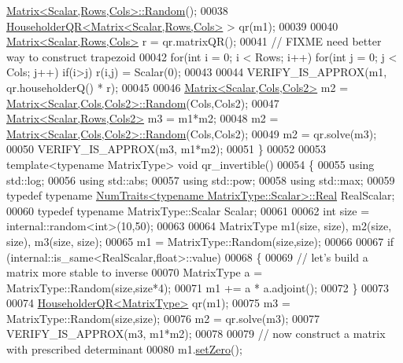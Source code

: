 \begin{DoxyCode}
      \hyperlink{group___core___module_class_eigen_1_1_matrix}{Matrix<Scalar,Rows,Cols>::Random}();
00038   \hyperlink{group___q_r___module_class_eigen_1_1_householder_q_r}{HouseholderQR<Matrix<Scalar,Rows,Cols>} > qr(m1);
00039 
00040   \hyperlink{group___core___module_class_eigen_1_1_matrix}{Matrix<Scalar,Rows,Cols>} r = qr.matrixQR();
00041   \textcolor{comment}{// FIXME need better way to construct trapezoid}
00042   \textcolor{keywordflow}{for}(\textcolor{keywordtype}{int} i = 0; i < Rows; i++) for(int j = 0; j < Cols; j++) if(i>j) r(i,j) = Scalar(0);
00043 
00044   VERIFY\_IS\_APPROX(m1, qr.householderQ() * r);
00045 
00046   \hyperlink{group___core___module_class_eigen_1_1_matrix}{Matrix<Scalar,Cols,Cols2>} m2 = 
      \hyperlink{group___core___module_class_eigen_1_1_matrix}{Matrix<Scalar,Cols,Cols2>::Random}(Cols,Cols2);
00047   \hyperlink{group___core___module_class_eigen_1_1_matrix}{Matrix<Scalar,Rows,Cols2>} m3 = m1*m2;
00048   m2 = \hyperlink{group___core___module_class_eigen_1_1_matrix}{Matrix<Scalar,Cols,Cols2>::Random}(Cols,Cols2);
00049   m2 = qr.solve(m3);
00050   VERIFY\_IS\_APPROX(m3, m1*m2);
00051 \}
00052 
00053 \textcolor{keyword}{template}<\textcolor{keyword}{typename} MatrixType> \textcolor{keywordtype}{void} qr\_invertible()
00054 \{
00055   \textcolor{keyword}{using} std::log;
00056   \textcolor{keyword}{using} std::abs;
00057   \textcolor{keyword}{using} std::pow;
00058   \textcolor{keyword}{using} std::max;
00059   \textcolor{keyword}{typedef} \textcolor{keyword}{typename} \hyperlink{group___core___module_struct_eigen_1_1_num_traits}{NumTraits<typename MatrixType::Scalar>::Real}
       RealScalar;
00060   \textcolor{keyword}{typedef} \textcolor{keyword}{typename} MatrixType::Scalar Scalar;
00061 
00062   \textcolor{keywordtype}{int} size = internal::random<int>(10,50);
00063 
00064   MatrixType m1(size, size), m2(size, size), m3(size, size);
00065   m1 = MatrixType::Random(size,size);
00066 
00067   \textcolor{keywordflow}{if} (internal::is\_same<RealScalar,float>::value)
00068   \{
00069     \textcolor{comment}{// let's build a matrix more stable to inverse}
00070     MatrixType a = MatrixType::Random(size,size*4);
00071     m1 += a * a.adjoint();
00072   \}
00073 
00074   \hyperlink{group___q_r___module}{HouseholderQR<MatrixType>} qr(m1);
00075   m3 = MatrixType::Random(size,size);
00076   m2 = qr.solve(m3);
00077   VERIFY\_IS\_APPROX(m3, m1*m2);
00078 
00079   \textcolor{comment}{// now construct a matrix with prescribed determinant}
00080   m1.\hyperlink{class_eigen_1_1_plain_object_base_ac21ad5f989f320e46958b75ac8d9a1da}{setZero}();

\end{DoxyCode}
